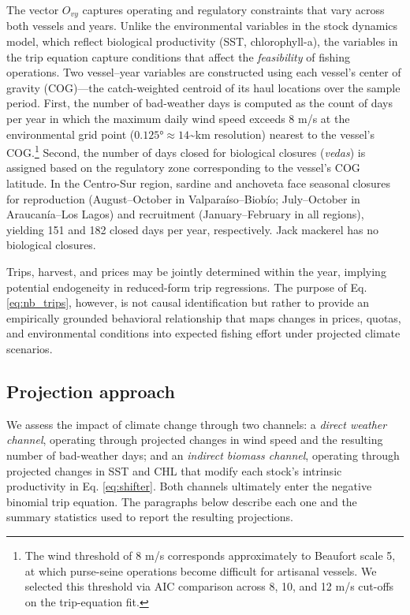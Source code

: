 \documentclass[
  11pt,
]{article}
\begin{document}
The vector \(O_{vy}\) captures operating and regulatory constraints that vary across both vessels and years. Unlike the environmental variables in the stock dynamics model, which reflect biological productivity (SST, chlorophyll-a), the variables in the trip equation capture conditions that affect the \emph{feasibility} of fishing operations. Two vessel--year variables are constructed using each vessel's center of gravity (COG)---the catch-weighted centroid of its haul locations over the sample period. First, the number of bad-weather days is computed as the count of days per year in which the maximum daily wind speed exceeds 8 m/s at the environmental grid point (\(0.125° \approx 14\)\textasciitilde km resolution) nearest to the vessel's COG.\footnote{The wind threshold of 8 m/s corresponds approximately to Beaufort scale 5, at which purse-seine operations become difficult for artisanal vessels. We selected this threshold via AIC comparison across 8, 10, and 12 m/s cut-offs on the trip-equation fit.} Second, the number of days closed for biological closures (\textit{vedas}) is assigned based on the regulatory zone corresponding to the vessel's COG latitude. In the Centro-Sur region, sardine and anchoveta face seasonal closures for reproduction (August--October in Valparaíso--Biobío; July--October in Araucanía--Los Lagos) and recruitment (January--February in all regions), yielding 151 and 182 closed days per year, respectively. Jack mackerel has no biological closures.

Trips, harvest, and prices may be jointly determined within the year, implying potential endogeneity in reduced-form trip regressions. The purpose of Eq. \eqref{eq:nb_trips}, however, is not causal identification but rather to provide an empirically grounded behavioral relationship that maps changes in prices, quotas, and environmental conditions into expected fishing effort under projected climate scenarios.

\subsection{Projection approach}\label{projection-approach}

We assess the impact of climate change through two channels: a \emph{direct weather channel}, operating through projected changes in wind speed and the resulting number of bad-weather days; and an \emph{indirect biomass channel}, operating through projected changes in SST and CHL that modify each stock's intrinsic productivity in Eq. \eqref{eq:shifter}. Both channels ultimately enter the negative binomial trip equation. The paragraphs below describe each one and the summary statistics used to report the resulting projections.
\end{document}
